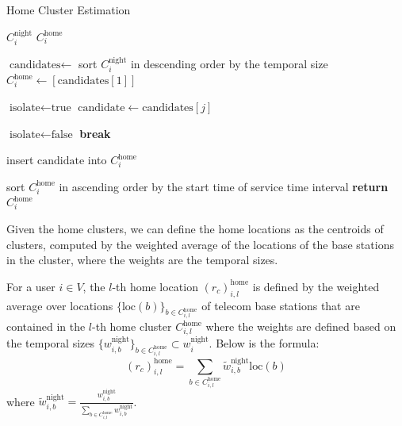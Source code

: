 \begin{algorithm}[h!]
    \renewcommand{\algorithmicrequire}{\textbf{Input:}}
    \renewcommand{\algorithmicensure}{\textbf{Output:}}
    \caption{Home Cluster Estimation}
    \label{home_cluster}
    \begin{algorithmic}[1]
        \REQUIRE $C^\text{night}_i$
        \ENSURE $C^\text{home}_i$

        \STATE $\text{candidates} \leftarrow$ sort $C^\text{night}_i$ in descending order by the temporal size
        \STATE $C^\text{home}_i \leftarrow [\text{candidates}[1]]$
        \STATE

            \STATE $\text{isolate} \gets \text{true}$
            \STATE $\text{candidate} \gets \text{candidates}[j]$
            \STATE

                    \STATE $\text{isolate} \gets \text{false}$
                    \STATE \textbf{break}
                \ENDIF
            \ENDFOR
            \STATE

                \STATE insert $\text{candidate}$ into $C^\text{home}_i$
            \ENDIF
        \ENDFOR
        \STATE

        \STATE sort $C^\text{home}_i$ in ascending order by the start time of service time interval
        \STATE \textbf{return} $C^\text{home}_i$
    \end{algorithmic}
\end{algorithm}

Given the home clusters, we can define the home locations as the centroids of clusters, computed by the weighted average of the locations of the base stations in the cluster, where the weights are the temporal sizes.

\clearpage\newpage
\begin{definition}
For a user $i \in V$, the $l$-th home location $(r_c)^{\text{home}}_{i, l}$ is defined by the weighted average over locations $\{\text{loc}(b)\}_{b \in C^{\text{home}}_{i, l}}$ of telecom base stations that are contained in the $l$-th home cluster $C^{\text{home}}_{i, l}$ where the weights are defined based on the temporal sizes $\{w^{\text{night}}_{i, b}\}_{b \in C^{\text{home}}_{i, l}} \subset w^\text{night}_i$. Below is the formula:
$$
(r_c)^{\text{home}}_{i, l} =
\sum_{b \in C^{\text{home}}_{i, l}}
\tilde{w}^{\text{night}}_{i, b} \text{loc}(b)
$$
where $\tilde{w}^{\text{night}}_{i, b} = \frac{w^{\text{night}}_{i, b}}{\sum_{b \in C^{\text{home}}_{i, l}} w^{\text{night}}_{i, b}}$.
\end{definition}

